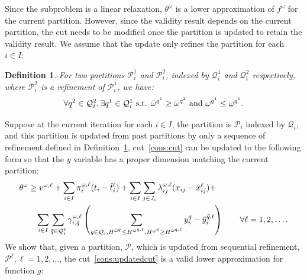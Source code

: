 \documentclass[11pt]{article}
\newtheorem{definition}{Definition}
\newcommand{\noi}{\noindent}
\renewcommand{\underbar}{\underaccent{\bar}}
\begin{document}
	Since the subproblem is a linear relaxation, \(\theta^\omega\) is a lower approximation of \(f^\omega\) for the current partition. However, since the validity result depends on the current partition, the cut needs to be modified once the partition is updated to retain the validity result. We assume that the update only refines the partition for each \(i \in I\):
	\begin{definition} \label{definition:refinement}
		For two partitions \(\mathcal{P}^1_i\) and \(\mathcal{P}^2_i\), indexed by \(\mathcal{Q}^1_i\) and \(\mathcal{Q}^2_i\) respectively, where \(\mathcal{P}^2_i\) is a refinement of \(\mathcal{P}^1_i\), we have:
		\begin{equation*}
		\forall q^2 \in \mathcal{Q}^2_i, \exists q^1 \in \mathcal{Q}^1_i \text{ s.t. } \bar{\omega}^{q^1} \geq \bar{\omega}^{q^2} \text{ and } \underbar{\omega}^{q^1} \leq \underbar{\omega}^{q^1}.
		\end{equation*}
	\end{definition}
	\noi Suppose at the current iteration for each \(i \in I\), the partition is \(\mathcal{P}_i\) indexed by \(\mathcal{Q}_i\), and this partition is updated from past partitions by only a sequence of refinement defined in Definition~\ref{definition:refinement}, cut~\eqref{cons:cut} can be updated to the following form so that the \(y\) variable has a proper dimension matching the current partition:
	\begin{align} \label{cons:updatedcut}
		& \theta^\omega \geq v^{\omega,\ell} + \sum_{i \in I} \pi_i^{\omega,\ell} (t_i - \hat{t}_i^{\ell}) + \sum_{i \in I} \sum_{j \in J_i} \lambda_{ij}^{\omega,\ell} (x_{ij} - \hat{x}_{ij}^{\ell}) + \nonumber \\
		& \qquad \sum_{i \in I} \sum_{\tilde{q} \in \mathcal{Q}^{\ell}_i} \gamma_{i,\tilde{q}}^{\omega,\ell} \left( \sum_{q \in \mathcal{Q}_i, H^{\bar{\omega}^{q}} \leq H^{\bar{\omega}^{\tilde{q},\ell}},H^{\underbar{\omega}^{q}} \geq H^{\bar{\omega}^{\tilde{q},\ell}} }y_i^{q} - \hat{y}_i^{\tilde{q},\ell} \right) \qquad \forall \ell = 1,2, \dots.
	\end{align}
	We show that, given a partition, \(\mathcal{P}\), which is updated from sequential refinement, \(\mathcal{P}^\ell, \ell = 1,2,\dots\), the cut~\eqref{cons:updatedcut} is a valid lower approximation for function \(g\):
\end{document}

